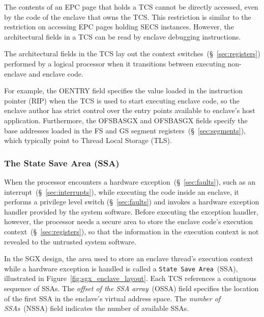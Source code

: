 
The contents of an EPC page that holds a TCS cannot be directly accessed, even
by the code of the enclave that owns the TCS. This restriction is similar to the
restriction on accessing EPC pages holding SECS instances. However, the
architectural fields in a TCS can be read by enclave debugging instructions.

The architectural fields in the TCS lay out the context
switches~(\S~\ref{sec:registers}) performed by a logical processor when it
transitions between executing non-enclave and enclave code.

For example, the OENTRY field specifies the value loaded in the instruction
pointer (RIP) when the TCS is used to start executing enclave code, so the
enclave author has strict control over the entry points available to enclave's
host application. Furthermore, the OFSBASGX and OFSBASGX fields specify the
base addresses loaded in the FS and GS segment
registers~(\S~\ref{sec:segments}), which typically point to Thread Local
Storage (TLS).


\subsubsection{The State Save Area (SSA)}
\label{sec:sgx_ssa}



When the processor encounters a hardware exception~(\S~\ref{sec:faults}), such
as an interrupt~(\S~\ref{sec:interrupts}), while executing the code inside an
enclave, it performs a privilege level switch (\S~\ref{sec:faults}) and invokes
a hardware exception handler provided by the system software. Before executing
the exception handler, however, the processor needs a secure area to store the
enclave code's execution context~(\S~\ref{sec:registers}), so that the
information in the execution context is not revealed to the untrusted system
software.


In the SGX design, the area used to store an enclave thread's execution context
while a hardware exception is handled is called a \texttt{State Save
Area}~(SSA), illustrated in Figure~\ref{fig:sgx_enclave_layout}. Each TCS
references a contiguous sequence of SSAs. The \textit{offset of the SSA
array}~(OSSA) field specifies the location of the first SSA in the enclave's
virtual address space. The \textit{number of SSAs}~(NSSA) field indicates the
number of available SSAs.

